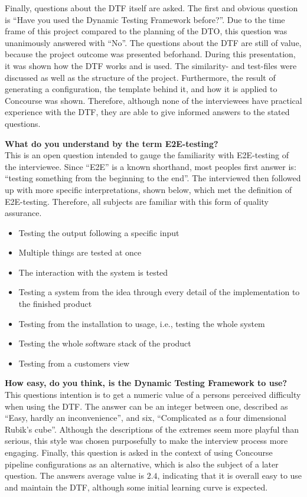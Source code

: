 Finally, questions about the DTF itself are asked.
The first and obvious question is ``Have you used the Dynamic Testing Framework before?''.
Due to the time frame of this project compared to the planning of the DTO, this question was unanimously answered with ``No''.
The questions about the DTF are still of value, because the project outcome was presented beforhand.
During this presentation, it was shown how the DTF works and is used.
The similarity- and test-files were discussed as well as the structure of the project.
Furthermore, the result of generating a configuration, the template behind it, and how it is applied to Concourse was shown.
Therefore, although none of the interviewees have practical experience with the DTF, they are able to give informed answers to the stated questions.

\textbf{What do you understand by the term E2E-testing?}\\
This is an open question intended to gauge the familiarity with E2E-testing of the interviewee.
Since ``E2E'' is a known shorthand, most peoples first answer is: ``testing something from the beginning to the end''.
The interviewed then followed up with more specific interpretations, shown below, which met the definition of E2E-testing.
Therefore, all subjects are familiar with this form of quality assurance.

\begin{itemize}
    \item Testing the output following a specific input
    \item Multiple things are tested at once
    \item The interaction with the system is tested
    \item Testing a system from the idea through every detail of the implementation to the finished product
    \item Testing from the installation to usage, i.e., testing the whole system
    \item Testing the whole software stack of the product
    \item Testing from a customers view
\end{itemize}

\textbf{How easy, do you think, is the Dynamic Testing Framework to use?}\\
This questions intention is to get a numeric value of a persons perceived difficulty when using the DTF.
The answer can be an integer between one, described as ``Easy, hardly an inconvenience'', and six, ``Complicated as a four dimensional Rubik's cube''.
Although the descriptions of the extremes seem more playful than serious, this style was chosen purposefully to make the interview process more engaging.
Finally, this question is asked in the context of using Concourse pipeline configurations as an alternative, which is also the subject of a later question.
The answers average value is $2.4$, indicating that it is overall easy to use and maintain the DTF, although some initial learning curve is expected.

